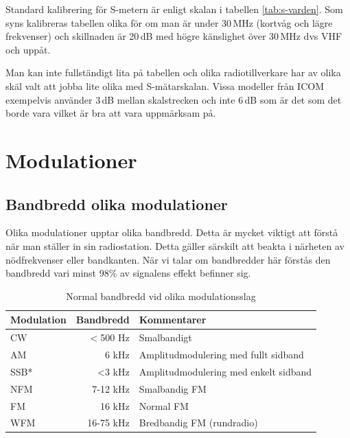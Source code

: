 Standard kalibrering för S-metern är enligt skalan i tabellen
\ref{tab:s-varden}. Som syns kalibreras tabellen olika för om man är under
30\,MHz (kortvåg och lägre frekvenser) och skillnaden är 20\,dB med högre
känslighet över 30\,MHz dvs VHF och uppåt.

Man kan inte fullständigt lita på tabellen och olika radiotillverkare har av
olika skäl valt att jobba lite olika med S-mätarskalan. Vissa modeller från
ICOM exempelvis använder 3\,dB mellan skalstrecken och inte 6\,dB som är det
som det borde vara vilket är bra att vara uppmärksam på.




\section{Modulationer}

\subsection{Bandbredd olika modulationer}

Olika modulationer upptar olika bandbredd. Detta är mycket viktigt att förstå
när man ställer in sin radiostation. Detta gäller särskilt att beakta i
närheten av nödfrekvenser eller bandkanten. När vi talar om bandbredder här
förstås den bandbredd vari minst 98\% av signalens effekt befinner sig.

\begin{table}[H]
\centering
\begin{tabular}{lrl}
	\textbf{Modulation} & \textbf{Bandbredd} & \textbf{Kommentarer}                  \\ \hline
	CW                  &          $<$500 Hz & Smalbandigt                           \\
	AM                  &              6 kHz & Amplitudmodulering med fullt sidband  \\
	SSB*                &             <3 kHz & Amplitudmodulering med enkelt sidband \\
	NFM                 &           7-12 kHz & Smalbandig FM                         \\
	FM                  &             16 kHz & Normal FM                             \\
	WFM                 &          16-75 kHz & Bredbandig FM (rundradio)
\end{tabular}
\caption{Normal bandbredd vid olika modulationsslag}
\end{table}

